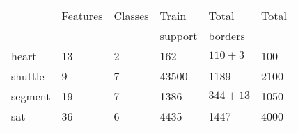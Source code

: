 \begin{tabular}{|l|lllll|}
	\hline
	& Features & Classes & Train & Total & Total \\
	& & & support & borders \\\hline
heart & 13 & 2 & 162 & $110\pm3$ & 100 \\
	shuttle & 9 & 7 & 43500 & 1189 & 2100 \\
	segment & 19 & 7 & 1386 & $344\pm13$ & 1050 \\
	sat & 36 & 6 & 4435 & 1447 & 4000 \\\hline
\end{tabular}

